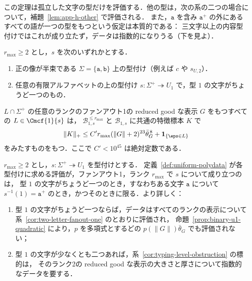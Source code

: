 この定理は孤立した文字の型だけを評価する．他の型は，次の系の二つの場合について，補題~\ref{lem:app-h-other} で評価される．
また，$\mathtt a$ を含み $\mathtt a^+$ の外にあるすべての語が一つの型をもつという仮定は本質的である：
三文字以上の内容型付けではこれが成り立たず，データは指数的になりうる（下を見よ）．

\begin{corollary}[孤立した文字からの多項式のデータ]
\label{cor:two-letter-fanout-one}
$r_{\max}\ge2$ とし，$s$ を次のいずれかとする．
\begin{enumerate}[label=\textup{(\roman*)},leftmargin=*]
\item 正の像が半束である $\Sigma=\{\mathtt a,\mathtt b\}$ 上の型付け（例えば $c$ や $s_{U,2}$）．
\item 任意の有限アルファベットの上の型付け $s:\Sigma^+\twoheadrightarrow U_1$ で，型 $1$ の文字がちょうど一つのもの．
\end{enumerate}
$L\cap\Sigma^+$ の任意のランクのファンアウト1の reduced good な表示 $G$ をもつすべての $L\in\Cmcf{1}{s}$ は，
$\mathcal B^{\le r_{\max}}_{1,s}$ と $\mathcal B_{1,s}$ に共通の特徴標本 $K$ で
\[
 \|K\|_+\le C'r_{\max}(\|G\|+2)^{23}\bar\theta_G^{\,8}+\mathbf 1_{\{\eps\in L\}}
\]
をみたすものをもつ．ここで $C'<10^{45}$ は絶対定数である．
\end{corollary}

\begin{corollary}
\label{cor:u1-classification}
$r_{\max}\ge2$ とし，$s:\Sigma^+\twoheadrightarrow U_1$ を型付けとする．
定義~\ref{def:uniform-polydata} が各型付けに求める評価が，ファンアウト1，ランク $r_{\max}$ で $s$ について成り立つのは，
型 $1$ の文字がちょうど一つのとき，すなわちある文字 $\mathtt a$ について $s^{-1}(1)=\mathtt a^+$ のとき，かつそのときに限る．より詳しく：
\begin{enumerate}[label=\textup{(\roman*)},leftmargin=*]
\item 型 $1$ の文字がちょうど一つならば，データはすべてのランクの表示について系~\ref{cor:two-letter-fanout-one} のとおりに評価され，
命題~\ref{prop:binary-u1-quadratic} により，$p$ を多項式とするどの $p(\|G\|)\bar\theta_G$ でも評価されない；
\item 型 $1$ の文字が少なくとも二つあれば，系~\ref{cor:typing-level-obstruction} の標的は，
そのランク2の reduced good な表示の大きさと厚さについて指数的なデータを要する．
\end{enumerate}
\end{corollary}

